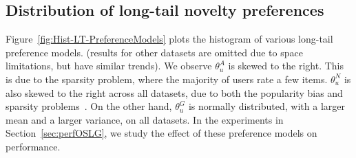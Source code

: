 \subsection{Distribution of long-tail novelty preferences}
Figure~\ref{fig:Hist-LT-PreferenceModels} plots the histogram of various long-tail preference 
\iffullpaper
models. 
\else 
(results for other datasets are omitted due to space limitations, but have similar trends). 
\fi 
We observe $\theta^A_u$ is skewed to the right. This is due to the sparsity problem, where the majority of users rate a few items. $\theta^N_u$  is also skewed to the right across all datasets, due to both the popularity bias and sparsity problems~\cite{agarwal_chen_2016,Marlin07collaborativefiltering}. 
On the other hand, $\theta^G_u$ is normally distributed, with a larger mean and  a larger variance, on all datasets. In the experiments in Section~\ref{sec:perfOSLG}, we study the effect of these preference models on performance. 

\iffalse
One explanation for the bias of all preference estimates towards lower values, is the popularity bias of  training data. In some datasets, such as MovieLens, movies are presented to users to warm-start the recommender system. The presented movies, and the observed ratings, can be biased toward more popular movies~\cite{agarwal_chen_2016,Marlin07collaborativefiltering}. As a result, the preference estimates are biased towards lower values for datasets that exhibit this popularity bias. 

Note,  on the MovieTweetings dataset, where users voluntarily rate movies, and the effect of presentation bias is negligible,   $\theta^*$ is normally distributed  with $\mu_{\theta^*}=0.522$ and $\sigma_{\theta^*}=0.178 $, while $\theta^T$ and $\theta^N$ remain skewed toward lower values. 

Note, popularity bias and sparsity are inherent characteristics of the recommendation domain, although some datasets suffer more.  Totally eliminating this bias, may not be advantageous. 
\fi


